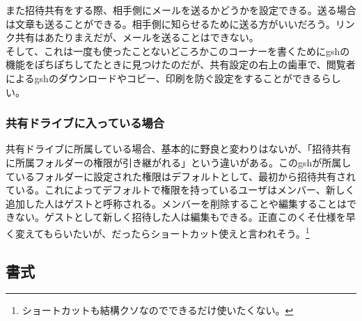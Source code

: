 \documentclass[a4paper]{ltjsreport}
\begin{document}
また招待共有をする際、相手側にメールを送るかどうかを設定できる。送る場合は文章も送ることができる。相手側に知らせるために送る方がいいだろう。リンク共有はあたりまえだが、メールを送ることはできない。
\\

そして、これは一度も使ったことないどころかこのコーナーを書くためにgshの機能をぽちぽちしてたときに見つけたのだが、共有設定の右上の歯車で、閲覧者によるgshのダウンロードやコピー、印刷を防ぐ設定をすることができるらしい。
\subsubsection{共有ドライブに入っている場合}
共有ドライブに所属している場合、基本的に野良と変わりはないが、「招待共有に所属フォルダーの権限が引き継がれる」という違いがある。このgshが所属しているフォルダーに設定された権限はデフォルトとして、最初から招待共有されている。これによってデフォルトで権限を持っているユーザはメンバー、新しく追加した人はゲストと呼称される。メンバーを削除することや編集することはできない。ゲストとして新しく招待した人は編集もできる。正直このくそ仕様を早く変えてもらいたいが、だったらショートカット使えと言われそう。\footnote{ショートカットも結構クソなのでできるだけ使いたくない。}

\subsection{書式}
\end{document}
